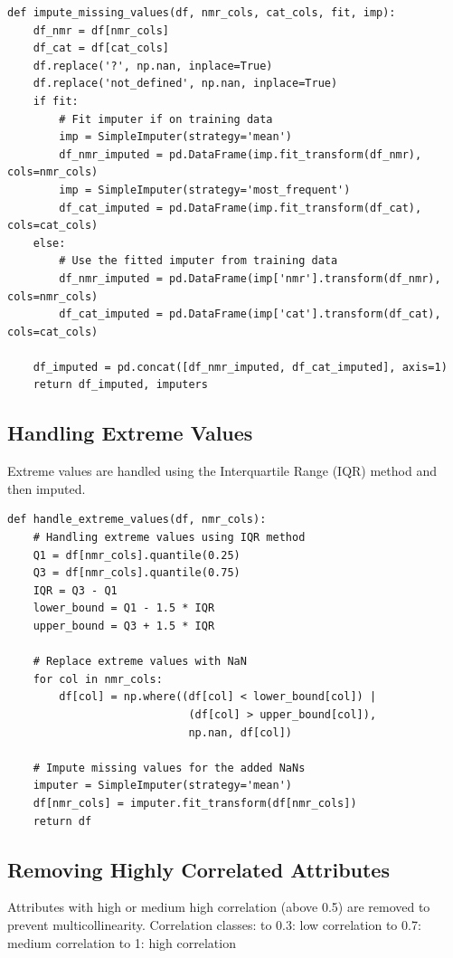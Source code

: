 \documentclass[a4paper,12pt]{article}
\begin{document}
\begin{verbatim}
def impute_missing_values(df, nmr_cols, cat_cols, fit, imp):
    df_nmr = df[nmr_cols]
    df_cat = df[cat_cols]
    df.replace('?', np.nan, inplace=True)
    df.replace('not_defined', np.nan, inplace=True)
    if fit:
        # Fit imputer if on training data
        imp = SimpleImputer(strategy='mean')
        df_nmr_imputed = pd.DataFrame(imp.fit_transform(df_nmr), cols=nmr_cols)
        imp = SimpleImputer(strategy='most_frequent')
        df_cat_imputed = pd.DataFrame(imp.fit_transform(df_cat), cols=cat_cols)
    else:
        # Use the fitted imputer from training data 
        df_nmr_imputed = pd.DataFrame(imp['nmr'].transform(df_nmr), cols=nmr_cols)
        df_cat_imputed = pd.DataFrame(imp['cat'].transform(df_cat), cols=cat_cols)

    df_imputed = pd.concat([df_nmr_imputed, df_cat_imputed], axis=1)
    return df_imputed, imputers
\end{verbatim}

\newpage
\subsection{Handling Extreme Values}
Extreme values are handled using the Interquartile Range (IQR) method and then imputed.

\begin{verbatim}
def handle_extreme_values(df, nmr_cols):
    # Handling extreme values using IQR method
    Q1 = df[nmr_cols].quantile(0.25)
    Q3 = df[nmr_cols].quantile(0.75)
    IQR = Q3 - Q1
    lower_bound = Q1 - 1.5 * IQR
    upper_bound = Q3 + 1.5 * IQR

    # Replace extreme values with NaN
    for col in nmr_cols:
        df[col] = np.where((df[col] < lower_bound[col]) | 
                            (df[col] > upper_bound[col]), 
                            np.nan, df[col])
    
    # Impute missing values for the added NaNs
    imputer = SimpleImputer(strategy='mean')
    df[nmr_cols] = imputer.fit_transform(df[nmr_cols])
    return df
\end{verbatim}

\subsection{Removing Highly Correlated Attributes}
Attributes with high or medium high correlation (above 0.5) are removed to prevent multicollinearity.
Correlation classes:
 to 0.3: low correlation
 to 0.7: medium correlation
 to 1: high correlation
\newline
\end{document}

